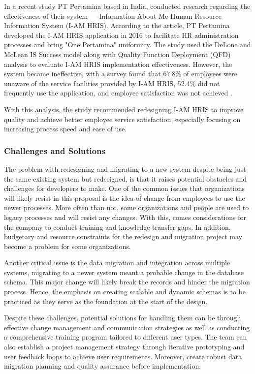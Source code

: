         In a recent study PT Pertamina based in India, conducted research regarding the effectiveness of their system --- Information About Me Human Resource Information System (I-AM HRIS). According to the article, PT Pertamina developed the I-AM HRIS application in 2016 to facilitate HR administration processes and bring "One Pertamina" uniformity. The study used the DeLone and McLean IS Success model along with Quality Function Deployment (QFD) analysis to evaluate I-AM HRIS implementation effectiveness. However, the system became ineffective, with a survey found that 67.8\% of employees were unaware of the service facilities provided by I-AM HRIS, 52.4\% did not frequently use the application, and employee satisfaction was not achieved \cite{rh12021}. 

        With this analysis, the study recommended redesigning I-AM HRIS to improve quality and achieve better employee service satisfaction, especially focusing on increasing process speed and ease of use.
        
        \subsubsection{Challenges and Solutions}
        The problem with redesigning and migrating to a new system despite being just the same existing system but redesigned, is that it raises potential obstacles and challenges for developers to make. One of the common issues that organizations will likely resist in this proposal is the idea of change from employees to use the newer processes. More often than not, some organizations and people are used to legacy processes and will resist any changes. With this, comes considerations for the company to conduct training and knowledge transfer gaps. In addition, budgetary and resource constraints for the redesign and migration project may become a problem for some organizations.

        Another critical issue is the data migration and integration across multiple systems, migrating to a newer system meant a probable change in the database schema. This major change will likely break the records and hinder the migration process. Hence, the emphasis on creating scalable and dynamic schemas is to be practiced as they serve as the foundation at the start of the design.
        
        Despite these challenges, potential solutions for handling them can be through effective change management and communication strategies as well as conducting a comprehensive training program tailored to different user types. The team can also establish a project management strategy through iterative prototyping and user feedback loops to achieve user requirements. Moreover, create robust data migration planning and quality assurance before implementation.
        

